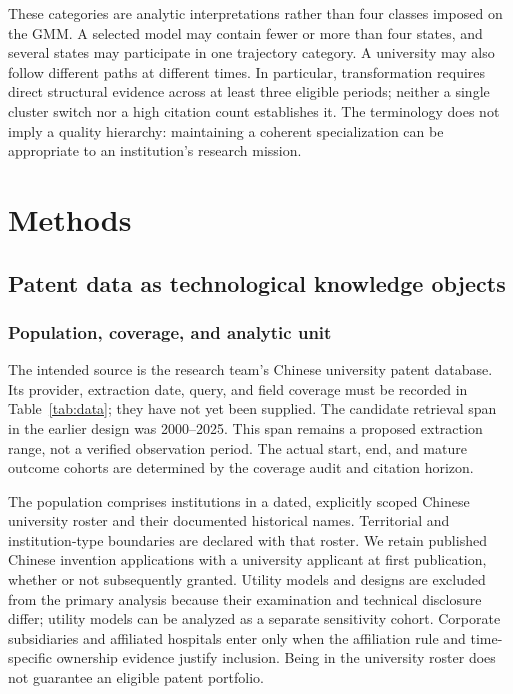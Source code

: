 These categories are analytic interpretations rather than four classes imposed
on the GMM. A selected model may contain fewer or more than four states, and
several states may participate in one trajectory category. A university may also
follow different paths at different times. In particular, transformation requires
direct structural evidence across at least three eligible periods; neither a
single cluster switch nor a high citation count establishes it. The terminology
does not imply a quality hierarchy: maintaining a coherent specialization can be
appropriate to an institution's research mission.

\section{Methods}\label{sec:methods}
\subsection{Patent data as technological knowledge objects}\label{sec:data}
\subsubsection{Population, coverage, and analytic unit}
The intended source is the research team's Chinese university patent database.
Its provider, extraction date, query, and field coverage must be recorded in
Table~\ref{tab:data}; they have not yet been supplied. The candidate retrieval span
in the earlier design was 2000--2025. This span remains a proposed extraction range,
not a verified observation period. The actual start, end, and mature outcome
cohorts are determined by the coverage audit and citation horizon.

The population comprises institutions in a dated, explicitly scoped Chinese
university roster and their documented historical names. Territorial and
institution-type boundaries are declared with that roster. We retain published
Chinese invention applications with a university applicant at first publication,
whether or not subsequently granted. Utility models and designs are excluded from
the primary analysis because their examination and technical disclosure differ;
utility models can be analyzed as a separate sensitivity cohort. Corporate
subsidiaries and affiliated hospitals enter only when the affiliation rule and
time-specific ownership evidence justify inclusion. Being in the university
roster does not guarantee an eligible patent portfolio.

